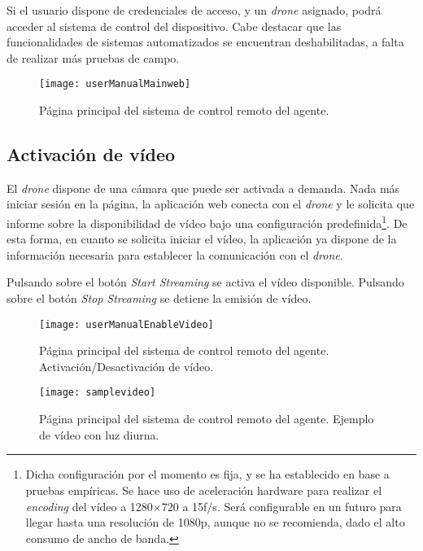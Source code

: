 Si el usuario dispone de credenciales de acceso, y un \emph{drone} asignado, podrá acceder al sistema de control del dispositivo. Cabe destacar que las funcionalidades de sistemas automatizados se encuentran deshabilitadas, a falta de realizar más pruebas de campo.

\begin{figure}[H]
	\centering
	\texttt{[image: userManualMainweb]}
	\caption[Página principal de control del sistema.]{Página principal del sistema de control remoto del agente.}\label{fig:userManualMainweb}
\end{figure}


\subsection{Activación de vídeo}
\label{subsec:videoEnable}
El \emph{drone} dispone de una cámara que puede ser activada a demanda. Nada más iniciar sesión en la página, la aplicación web conecta con el \emph{drone} y le solicita que informe sobre la disponibilidad de vídeo bajo una configuración predefinida\footnote{Dicha configuración por el momento es fija, y se ha establecido en base a pruebas empíricas. Se hace uso de aceleración hardware para realizar el \emph{encoding} del vídeo a 1280$\times$720 a 15f/s. Será configurable en un futuro para llegar hasta una resolución de 1080p, aunque no se recomienda, dado el alto consumo de ancho de banda.}. De esta forma, en cuanto se solicita iniciar el vídeo, la aplicación ya dispone de la información necesaria para establecer la comunicación con el \emph{drone}.

Pulsando sobre el botón \emph{Start Streaming} se activa el vídeo disponible. Pulsando sobre el botón \emph{Stop Streaming} se detiene la emisión de vídeo. 

 
\begin{figure}[H]
	\centering
	\texttt{[image: userManualEnableVideo]}
	\caption[Página principal. Gestión de vídeo.]{Página principal del sistema de control remoto del agente. Activación/Desactivación de vídeo.}\label{fig:userManualEnableVideo}
\end{figure}

\begin{figure}[H]
	\centering
	\texttt{[image: samplevideo]}
	\caption[Página principal. Gestión de vídeo.]{Página principal del sistema de control remoto del agente. Ejemplo de vídeo con luz diurna.}\label{fig:samplevideo}
\end{figure}

